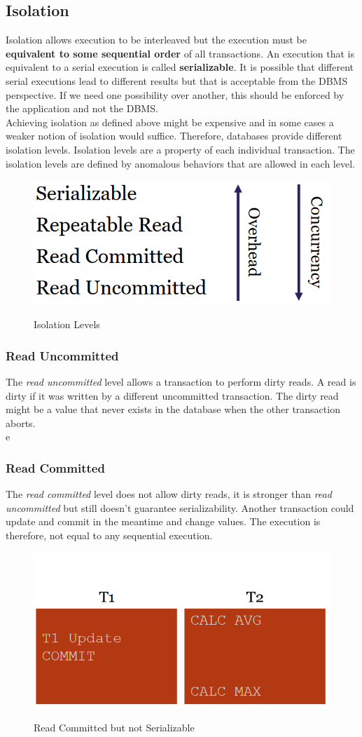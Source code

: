 \subsection{Isolation}
Isolation allows execution to be interleaved but the execution must be \textbf{equivalent to some sequential order} of all transactions. An execution that is equivalent to a serial execution is called \textbf{serializable}. It is possible that different serial executions lead to different results but that is acceptable from the DBMS perspective. If we need one possibility over another, this should be enforced by the application and not the DBMS.\\
Achieving isolation as defined above might be expensive and in some cases a weaker notion of isolation would suffice. Therefore, databases provide different isolation levels. Isolation levels are a property of each individual transaction. The isolation levels are defined by anomalous behaviors that are allowed in each level.
\begin{figure}[H]
\centering
\includegraphics[width=.3\textwidth]{images/isolation_levels.PNG}
\label{isolation_levels}
\caption{Isolation Levels}
\end{figure}

\subsubsection{Read Uncommitted}
The \textit{read uncommitted} level allows a transaction to perform dirty reads. A read is dirty if it was written by a different uncommitted transaction. The dirty read might be a value that never exists in the database when the other transaction aborts. \\e 

\subsubsection{Read Committed}
The \textit{read committed} level does not allow dirty reads, it is stronger than \textit{read uncommitted} but still doesn't guarantee serializability. Another transaction could update and commit in the meantime and change values. The execution is therefore, not equal to any sequential execution.
\begin{figure}[H]
\centering
\includegraphics[width=.3\textwidth]{images/read_committed.PNG}
\label{read_committed}
\caption{Read Committed but not Serializable}
\end{figure}

